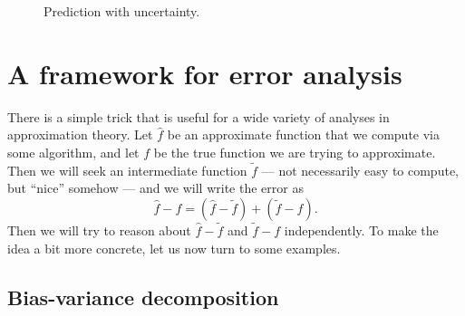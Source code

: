 \documentclass[12pt, leqno]{article} %
\begin{document}
\begin{figure}
 \begin{center}
 \end{center}
 \caption{Prediction with uncertainty.}
 \label{fig1}
\end{figure}

\section{A framework for error analysis}

There is a simple trick that is useful for a wide variety of analyses
in approximation theory.  Let $\hat{f}$ be an approximate function
that we compute via some algorithm, and let $f$ be the true function
we are trying to approximate.  Then we will seek an intermediate
function $\tilde{f}$ --- not necessarily easy to compute, but
``nice'' somehow --- and we will write the error as
\[
  \hat{f}-f = (\hat{f}-\tilde{f}) + (\tilde{f}-f).
\]
Then we will try to reason about $\hat{f}-\tilde{f}$ and $\tilde{f}-f$
independently.  To make the idea a bit more concrete, let us now turn
to some examples.

\subsection{Bias-variance decomposition}
\end{document}
